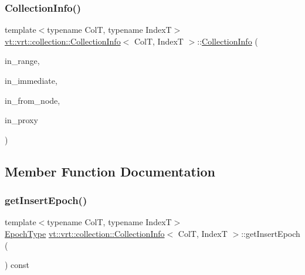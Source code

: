 \subsubsection{\texorpdfstring{Collection\+Info()}{CollectionInfo()}\hspace{0.1cm}{\footnotesize\ttfamily [3/3]}}
{\footnotesize\ttfamily template$<$typename ColT, typename IndexT$>$ \\
\hyperlink{structvt_1_1vrt_1_1collection_1_1_collection_info}{vt\+::vrt\+::collection\+::\+Collection\+Info}$<$ ColT, IndexT $>$\+::\hyperlink{structvt_1_1vrt_1_1collection_1_1_collection_info}{Collection\+Info} (\begin{DoxyParamCaption}\item[{IndexT const \&}]{in\+\_\+range,  }\item[{bool const}]{in\+\_\+immediate,  }\item[{\hyperlink{namespacevt_a866da9d0efc19c0a1ce79e9e492f47e2}{Node\+Type} const \&}]{in\+\_\+from\+\_\+node,  }\item[{\hyperlink{namespacevt_a1b417dd5d684f045bb58a0ede70045ac}{Virtual\+Proxy\+Type}}]{in\+\_\+proxy }\end{DoxyParamCaption})\hspace{0.3cm}{\ttfamily [inline]}}



\subsection{Member Function Documentation}
\mbox{\label{structvt_1_1vrt_1_1collection_1_1_collection_info_a9c81de9eeddd203f92d76d80b2e09e3c}} 
\subsubsection{\texorpdfstring{get\+Insert\+Epoch()}{getInsertEpoch()}}
{\footnotesize\ttfamily template$<$typename ColT, typename IndexT$>$ \\
\hyperlink{namespacevt_a985a5adf291c34a3ca263b3378388236}{Epoch\+Type} \hyperlink{structvt_1_1vrt_1_1collection_1_1_collection_info}{vt\+::vrt\+::collection\+::\+Collection\+Info}$<$ ColT, IndexT $>$\+::get\+Insert\+Epoch (\begin{DoxyParamCaption}{ }\end{DoxyParamCaption}) const\hspace{0.3cm}{\ttfamily [inline]}}

